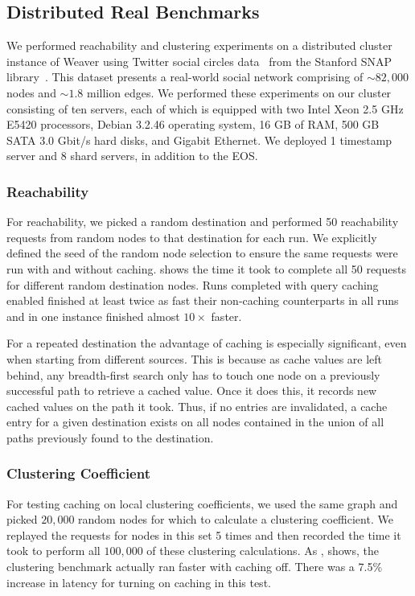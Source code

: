 \documentclass[letterpaper,twocolumn,11pt,tight]{article}
\begin{document}
\subsection{Distributed Real Benchmarks}

We performed reachability and clustering experiments on a distributed cluster instance of Weaver using Twitter social circles data~\cite{twitter_data} from the Stanford SNAP library~\cite{snap}.
This dataset presents a real-world social network comprising of $\sim 82,000$ nodes and $\sim 1.8$ million edges.
We performed these experiments on our cluster consisting of ten servers, each of which is equipped with two Intel Xeon 2.5 GHz E5420 processors, Debian 3.2.46 operating system, 16 GB of RAM, 500 GB SATA 3.0 Gbit/s hard disks, and Gigabit Ethernet.
We deployed 1 timestamp server and 8 shard servers, in addition to the EOS.

\subsubsection{Reachability}
For reachability, we picked a random destination and performed 50 reachability requests from random nodes to that destination for each run. We explicitly defined the seed of the random node selection to ensure the same requests were run with and without caching.
 shows the time it took to complete all 50 requests for different random destination nodes. Runs completed with query caching enabled finished at least twice as fast their non-caching counterparts in all runs and in one instance finished almost $10\times$ faster.

For a repeated destination the advantage of caching is especially significant, even when starting from different sources. This is because as cache values are left behind, any breadth-first search only has to touch one node on a previously successful path to retrieve a cached value. Once it does this, it records new cached values on the path it took. Thus, if no entries are invalidated, a cache entry for a given destination exists on all nodes contained in the union of all paths previously found to the destination.

\subsubsection{Clustering Coefficient}
For testing caching on local clustering coefficients, we used the same graph and picked $20,000$ random nodes for which to calculate a clustering coefficient.
We replayed the requests for nodes in this set 5 times and then recorded the time it took to perform all $100,000$ of these clustering calculations.
As , shows, the clustering benchmark actually ran faster with caching off. There was a 7.5\% increase in latency for turning on caching in this test.
\end{document}
